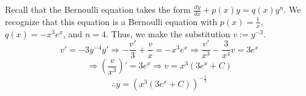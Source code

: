 \item

Recall that the Bernoulli equation takes the form $\frac{dy}{dx} + p(x)y = q(x)y^n$.
We recognize that this equation is a Bernoulli equation with $p(x) = \frac{1}{x}$, $q(x) = -x^3 e^x$, and $n = 4$.
Thus, we make the substitution $v := y^{-3}$.
\[
	v' = -3y^{-4} y'
	\Rightarrow -\frac{v'}{3} + \frac{v}{x} = -x^3 e^x
	\Rightarrow \frac{v'}{x^3} - \frac{3}{x^4} v = 3e^x
\]
\[
	\Rightarrow \left( \frac{v}{x^3} \right)' = 3e^x
	\Rightarrow v = x^3 (3e^x + C)
\]
\[
	\therefore y = {\left( x^3 (3e^x + C) \right)}^{-\frac{1}{3}}
\]